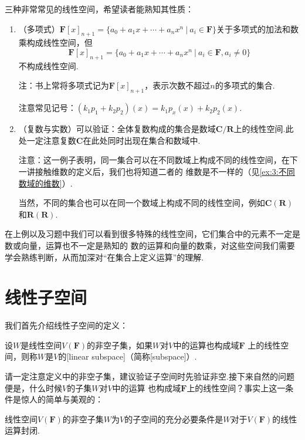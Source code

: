 \begin{example}
    三种非常常见的线性空间，希望读者能熟知其性质：
    \begin{enumerate}
        \item （多项式）$\mathbf{F}[x]_{n+1}=\{a_0+a_1x+\cdots+a_nx^n\ |\ a_i\in\mathbf{F}\}$关于多项式的加法和数乘构成线性空间，但
        \[\mathbf{F}[x]_{n+1}=\{a_0+a_1x+\cdots+a_nx^n\ |\ a_i\in\mathbf{F},a_i\neq 0\}\]
        不构成线性空间.

        注：书上常将多项式记为$\mathbf{F}[x]_{n+1}$，表示次数不超过$n$的多项式的集合.

        注意常见记号：$(k_1p_1+k_2p_2)(x)=k_1p_x(x)+k_2p_2(x)$.
        \item （复数与实数）可以验证：全体复数构成的集合是数域$\mathbf{C}/\mathbf{R}$上的线性空间.此处一定注意复数$\mathbf{C}$在此处同时出现在集合和数域中.

        注意：这一例子表明，同一集合可以在不同数域上构成不同的线性空间，在下一讲接触维数的定义后，我们也将知道二者的
        维数是不一样的（见\autoref{ex:3:不同数域的维数}）.
        
        当然，不同的集合也可以在同一个数域上构成不同的线性空间，例如$\mathbf{C(R)}$和$\mathbf{R(R)}$.
    \end{enumerate}
\end{example}

在上例以及习题中我们可以看到很多特殊的线性空间，它们集合中的元素不一定是数或向量，运算也不一定是熟知的
数的运算和向量的数乘，对这些空间我们需要学会熟练判断，从而加深对``在集合上定义运算''的理解.

\section{线性子空间}
我们首先介绍线性子空间的定义：
\begin{definition}
    设$W$是线性空间$V(\mathbf{F})$的非空子集，如果$W$对$V$中的运算也构成域$\mathbf{F}$
    上的线性空间，则称$W$是$V$的[linear subspace]（简称[subspace]）.
\end{definition}

请一定注意定义中的非空子集，建议验证子空间时先验证非空.接下来自然的问题便是，什么时候$V$的子集$W$对$V$中的运算
也构成域$\mathbf{F}$上的线性空间？事实上这一条件是惊人的简单与美观的：
\begin{theorem}\label{thm:2:子空间判别}
    线性空间$V(\mathbf{F})$的非空子集$W$为$V$的子空间的充分必要条件是$W$对于$V(\mathbf{F})$的线性运算封闭.
\end{theorem}

